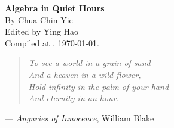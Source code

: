 \documentclass[english,10pt,a5paper]{article}
\theoremstyle{definition}
\begin{document}
	\begin{center}
	\Large \textbf{Algebra in Quiet Hours} \smallskip
		\\
	\large	By Chua Chin Yie 
	\\[1em] \small Edited by Ying Hao 
	\\ \small Compiled at \currenttime, \today.
	\\[2em]
	\end{center}

	\begin{center}
		\small
		\begin{minipage}{0.7\textwidth}
			\begin{verse}
			\itshape
			To see a world in a grain of sand \\
			And a heaven in a wild flower, \\
			Hold infinity in the palm of your hand \\
			And eternity in an hour.
			\end{verse}

			\hspace{0.26\textwidth} %
			--- \textit{Auguries of Innocence}, William Blake

		\end{minipage}
	\end{center}

    \tableofcontents 
    
    
\clearpage
{}
    
\begingroup
\allowdisplaybreaks
{




















}\endgroup

\clearpage
{}
\printbibliography
\end{document}
